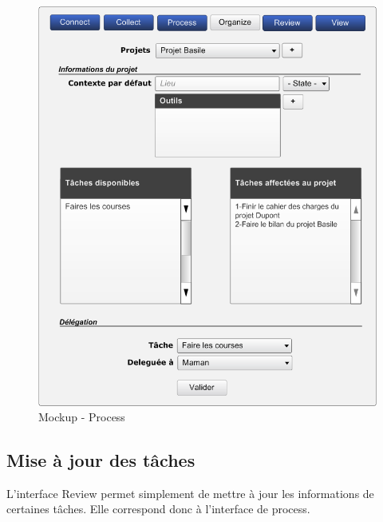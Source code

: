 \begin{figure}[H]
  \begin{center}
  \includegraphics[scale=0.5]{diagrams/organize.png}
  \caption{Mockup - Process}
  \end{center}
\end{figure}

\subsection{Mise à jour des tâches}
L'interface Review permet simplement de mettre à jour les informations de
certaines tâches. Elle correspond donc à l'interface de process.

